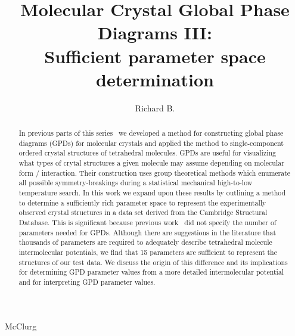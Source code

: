 \documentclass[preprint]{iucr}              %
\begin{document}
\title{Molecular Crystal Global Phase Diagrams III:\\ Sufficient parameter space determination}

\author[a,d]{Richard B.}{McClurg}



\begin{abstract}
\scriptsize%
In previous parts of this series~\cite{Mettes04,McClurg09} we developed a method for constructing global phase diagrams (GPDs) for molecular crystals and applied the method to single-component ordered crystal structures of tetrahedral molecules. GPDs are useful for visualizing what types of crytal structures a given molecule may assume depending on molecular form / interaction.  Their construction uses group theoretical methods which enumerate all possible symmetry-breakings during a statistical mechanical high-to-low temperature search. 
In this work we expand upon these results by outlining a method to determine a sufficiently rich parameter space to represent the experimentally observed crystal structures in a data set derived from the Cambridge Structural Database.  This is significant because previous work~\cite{Mettes04} did not specify the number of parameters needed for GPDs. Although there are suggestions in the literature that thousands of parameters are required to adequately describe tetrahedral molecule intermolecular potentials, we find that 15 parameters are sufficient to represent the structures of our test data.  We discuss the origin of this difference and its implications for determining GPD parameter values from a more detailed intermolecular potential and for interpreting GPD parameter values. 
\normalsize
\end{abstract}

\maketitle
\end{document}
